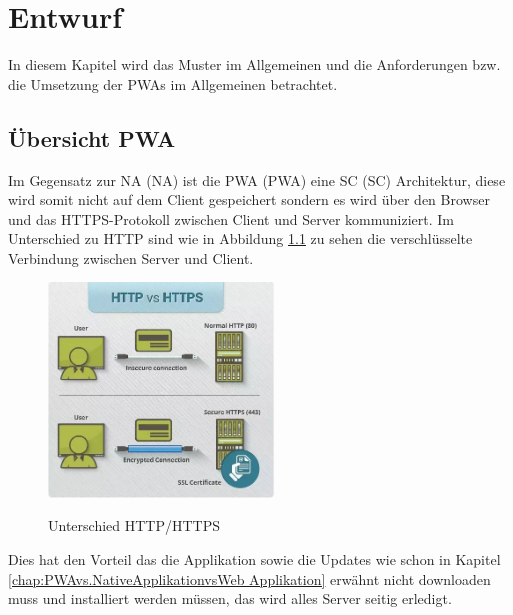\chapter{Entwurf}
\thispagestyle{standard}
\pagestyle{standard}
\renewcommand{\footrulewidth}{0.4pt}

In diesem Kapitel wird das Muster im Allgemeinen und die Anforderungen bzw. die Umsetzung der \aclp{PWA} im Allgemeinen betrachtet.


\section{Übersicht PWA}\label{sub:Übersicht PWA}
Im Gegensatz zur \acl{NA} (\acs{NA}) ist die \acl{PWA} (\acs{PWA}) eine \acl{SC} (\acs{SC}) Architektur, diese wird somit nicht auf dem Client gespeichert sondern es wird über den Browser und das HTTPS-Protokoll zwischen Client und Server kommuniziert. Im Unterschied zu HTTP sind wie in Abbildung \ref{fig:HTTP_HTTPS} zu sehen die verschlüsselte Verbindung zwischen Server und Client.

\begin{figure}[h]
	\centering
	\includegraphics[width=6cm]{BilderAllgemein/HTTP_HTTPS}\medskip
	\caption{Unterschied HTTP/HTTPS}
	\label{fig:HTTP_HTTPS}\cite{HTTPS}
\end{figure}

Dies hat den Vorteil das die Applikation sowie die Updates wie schon in Kapitel \ref{chap:PWAvs.NativeApplikationvsWeb Applikation} erwähnt nicht downloaden muss und installiert werden müssen, das wird alles Server seitig erledigt. 

\newpage

